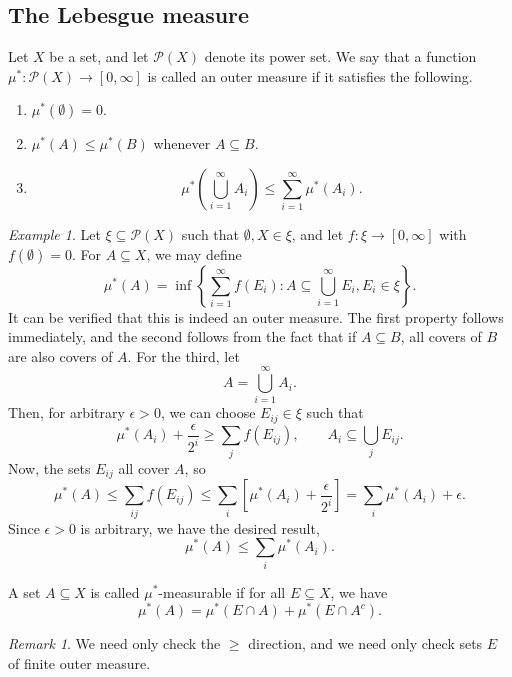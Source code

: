 \documentclass[11pt]{article}
\theoremstyle{definition}
\theoremstyle{remark}
\newtheorem*{remark}{Remark}
\newtheorem*{example}{Example}
\numberwithin{equation}{section}
\begin{document}
    \subsection{The Lebesgue measure}
    
    \begin{definition}
        Let $X$ be a set, and let $\mathcal{P}(X)$ denote its power set. We say that
        a function $\mu^*\colon \mathcal{P}(X) \to [0, \infty]$ is called an outer
        measure if it satisfies the following.
        \begin{enumerate}
            \itemsep0em
            \item $\mu^*(\emptyset) = 0$.
            \item $\mu^*(A) \leq \mu^*(B)$ whenever $A \subseteq B$.
            \item \[
                \mu^*\left(\bigcup_{i = 1}^\infty A_i\right) \leq \sum_{i = 1}^\infty
                \mu^*(A_i).
            \] 
        \end{enumerate}
    \end{definition}

    \begin{example}
        Let $\xi \subseteq \mathcal{P}(X)$ such that $\emptyset, X \in \xi$, and let
        $f\colon \xi \to [0, \infty]$ with $f(\emptyset) = 0$. For $A \subseteq X$,
        we may define \[
            \mu^*(A) = \inf\left\{\sum_{i = 1}^\infty f(E_i) : A \subseteq \bigcup_{i
            = 1}^\infty E_i, E_i \in \xi\right\}.
        \] It can be verified that this is indeed an outer measure. The first
        property follows immediately, and the second follows from the fact that if
        $A\subseteq B$, all covers of $B$ are also covers of $A$. For the third, let
        \[
            A = \bigcup_{i = 1}^\infty A_i.
        \] Then, for arbitrary $\epsilon > 0$, we can choose $E_{ij} \in \xi$ such
        that \[
            \mu^*(A_i) + \frac{\epsilon}{2^i} \geq \sum_j f(E_{ij}), \qquad 
            A_i \subseteq \bigcup_j E_{ij}.
        \] Now, the sets $E_{ij}$ all cover $A$, so \[
            \mu^*(A) \leq \sum_{ij} f(E_{ij}) \leq \sum_i \left[\mu^*(A_i) +
            \frac{\epsilon}{2^i}\right] = \sum_i \mu^*(A_i) + \epsilon.
        \] Since $\epsilon > 0$ is arbitrary, we have the desired result, \[
            \mu^*(A) \leq \sum_i \mu^*(A_i).
        \] 
    \end{example}

    \begin{definition}
        A set $A \subseteq X$ is called $\mu^*$-measurable if for all $E \subseteq
        X$, we have \[
            \mu^*(A) = \mu^*(E \cap A) + \mu^*(E \cap A^c).
        \]
        \begin{remark}
            We need only check the $\geq$ direction, and we need only check sets $E$
            of finite outer measure.
        \end{remark}
    \end{definition}
\end{document}
